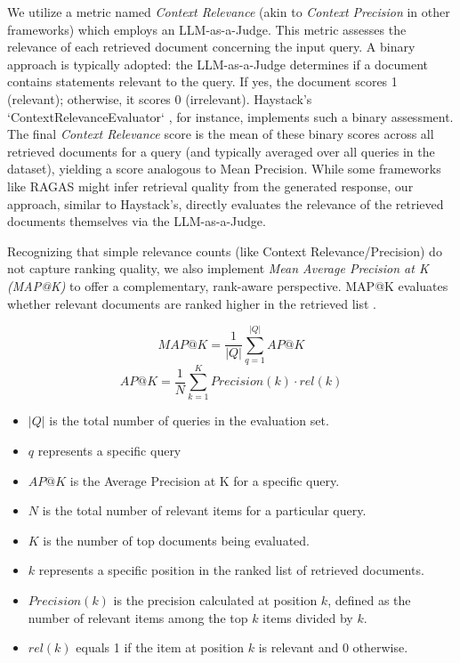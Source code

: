 We utilize a metric named \textit{Context Relevance} (akin to \textit{Context Precision} in other frameworks) which employs an LLM-as-a-Judge. This metric assesses the relevance of each retrieved document concerning the input query. A binary approach is typically adopted: the LLM-as-a-Judge determines if a document contains statements relevant to the query. If yes, the document scores 1 (relevant); otherwise, it scores 0 (irrelevant). Haystack's `ContextRelevanceEvaluator` \cite{Pietsch_Haystack_the_end-to-end_2019}, for instance, implements such a binary assessment. The final \textit{Context Relevance} score is the mean of these binary scores across all retrieved documents for a query (and typically averaged over all queries in the dataset), yielding a score analogous to Mean Precision. While some frameworks like RAGAS might infer retrieval quality from the generated response, our approach, similar to Haystack's, directly evaluates the relevance of the retrieved documents themselves via the LLM-as-a-Judge.

Recognizing that simple relevance counts (like Context Relevance/Precision) do not capture ranking quality, we also implement \textit{Mean Average Precision at K (MAP@K)} to offer a complementary, rank-aware perspective. MAP@K evaluates whether relevant documents are ranked higher in the retrieved list \cite{EvidentlyAIInc..25.02.2025}. 

$$MAP@K=\frac{1}{|Q|}\sum_{q=1}^{|Q|}AP@K$$
$$AP@K=\frac{1}{N}\sum_{k=1}^{K}Precision(k) \cdot rel(k)$$
\begin{itemize}
  \item $|Q|$ is the total number of queries in the evaluation set.
  \item $q$ represents a specific query
  \item $AP@K$ is the Average Precision at K for a specific query.
  \item $N$ is the total number of relevant items for a particular query.
  \item $K$ is the number of top documents being evaluated.
  \item $k$ represents a specific position in the ranked list of retrieved documents.
  \item $Precision(k)$ is the precision calculated at position $k$, defined as the number of relevant items among the top $k$ items divided by $k$.
  \item $rel(k)$ equals 1 if the item at position $k$ is relevant and 0 otherwise.
\end{itemize}

